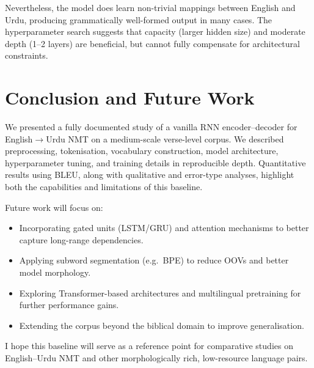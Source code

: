 \documentclass[runningheads]{llncs}
\begin{document}
Nevertheless, the model does learn non-trivial mappings between English and Urdu, producing grammatically well-formed output in many cases.
The hyperparameter search suggests that capacity (larger hidden size) and moderate depth (1--2 layers) are beneficial, but cannot fully compensate for architectural constraints.

\section{Conclusion and Future Work}
We presented a fully documented study of a vanilla RNN encoder--decoder for English$\rightarrow$Urdu NMT on a medium-scale verse-level corpus.
We described preprocessing, tokenisation, vocabulary construction, model architecture, hyperparameter tuning, and training details in reproducible depth.
Quantitative results using BLEU, along with qualitative and error-type analyses, highlight both the capabilities and limitations of this baseline.

Future work will focus on:
\begin{itemize}
    \item Incorporating gated units (LSTM/GRU) and attention mechanisms to better capture long-range dependencies.
    \item Applying subword segmentation (e.g.\ BPE) to reduce OOVs and better model morphology.
    \item Exploring Transformer-based architectures and multilingual pretraining for further performance gains.
    \item Extending the corpus beyond the biblical domain to improve generalisation.
\end{itemize}
I hope this baseline will serve as a reference point for comparative studies on English--Urdu NMT and other morphologically rich, low-resource language pairs.


\end{document}
